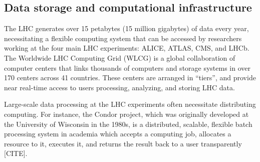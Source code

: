 \documentclass{article}
\begin{document}
\subsection{Data storage and computational infrastructure}
The LHC generates over 15 petabytes (15 million gigabytes) of data every year, necessitating a flexible computing system that can be accessed by researchers working at the four main LHC experiments: ALICE, ATLAS, CMS, and LHCb. The Worldwide LHC Computing Grid (WLCG) is a global collaboration of computer centers that links thousands of computers and storage systems in over 170 centers across 41 countries. These centers are arranged in ``tiers'', and provide near real-time access to users processing, analyzing, and storing LHC data. 

Large-scale data processing at the LHC experiments often necessitate distributing computing. For instance, the Condor project, which was originally developed at the University of Wisconsin in the 1980s, is a distributed, scalable, flexible batch processing system in academia which accepts a computing job, allocates a resource to it, executes it, and returns the result back to a user transparently [CITE]. 
 
\end{document}

